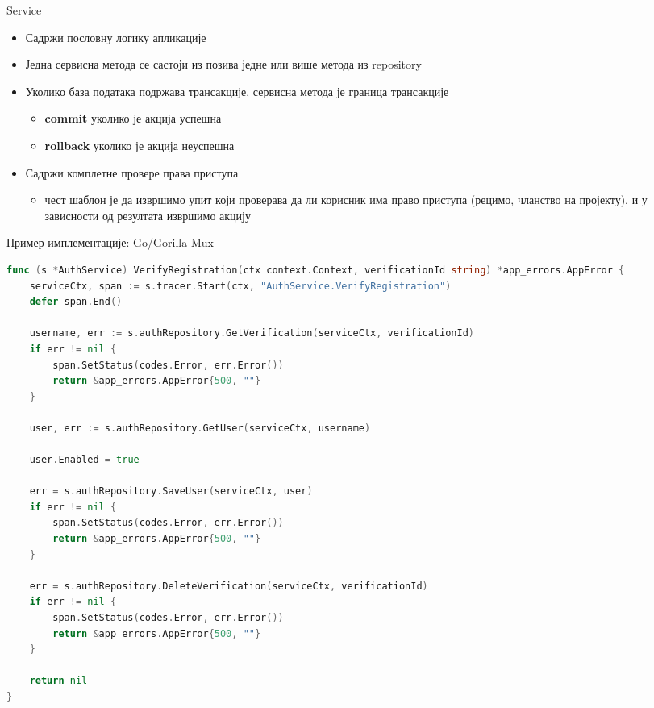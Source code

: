 \documentclass{beamer}
\begin{document}
    \begin{frame}{Service}
        \begin{itemize}
            \item Садржи пословну логику апликације
            \item Једна сервисна метода се састоји из позива једне или више метода из repository
            \item Уколико база података подржава трансакције, сервисна метода је граница трансакције
            \begin{itemize}
                \item \textbf{commit} уколико је акција успешна
                \item \textbf{rollback} уколико је акција неуспешна
            \end{itemize}
            \item Садржи комплетне провере права приступа
            \begin{itemize}
                \item чест шаблон је да извршимо упит који проверава да ли корисник има право приступа (рецимо, чланство на пројекту), и у зависности од резултата извршимо акцију
            \end{itemize}
        \end{itemize}
    \end{frame}
    
    \begin{frame}[fragile]{Пример имплементације: Go/Gorilla Mux}
        \begin{adjustbox}{width=\textwidth,height=\textheight,keepaspectratio}
            \begin{lstlisting}[language=go]
func (s *AuthService) VerifyRegistration(ctx context.Context, verificationId string) *app_errors.AppError {
    serviceCtx, span := s.tracer.Start(ctx, "AuthService.VerifyRegistration")
    defer span.End()

    username, err := s.authRepository.GetVerification(serviceCtx, verificationId)
    if err != nil {
        span.SetStatus(codes.Error, err.Error())
        return &app_errors.AppError{500, ""}
    }

    user, err := s.authRepository.GetUser(serviceCtx, username)

    user.Enabled = true

    err = s.authRepository.SaveUser(serviceCtx, user)
    if err != nil {
        span.SetStatus(codes.Error, err.Error())
        return &app_errors.AppError{500, ""}
    }

    err = s.authRepository.DeleteVerification(serviceCtx, verificationId)
    if err != nil {
        span.SetStatus(codes.Error, err.Error())
        return &app_errors.AppError{500, ""}
    }

    return nil
}
            \end{lstlisting}
        \end{adjustbox}
    \end{frame}
    
\end{document}
